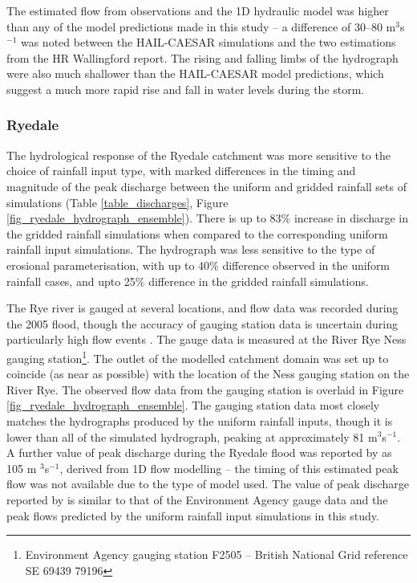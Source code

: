 The estimated flow from observations and the 1D hydraulic model was higher than any of the model predictions made in this study -- a difference of 30--80 m\(^3\)s\(^{-1}\) was noted between the HAIL-CAESAR simulations and the two estimations from the HR Wallingford report. The rising and falling limbs of the hydrograph were also much shallower than the HAIL-CAESAR model predictions, which suggest a much more rapid rise and fall in water levels during the storm. 

\subsubsection{Ryedale}

The hydrological response of the Ryedale catchment was more sensitive to the choice of rainfall input type, with marked differences in the timing and magnitude of the peak discharge between the uniform and gridded rainfall sets of simulations (Table \ref{table_discharges}, Figure \ref{fig_ryedale_hydrograph_ensemble}). There is up to 83\% increase in discharge in the gridded rainfall simulations when compared to the corresponding uniform rainfall input simulations. The hydrograph was less sensitive to the type of erosional parameterisation, with up to 40\% difference observed in the uniform rainfall cases, and upto 25\% difference in the gridded rainfall simulations. 

The Rye river is gauged at several locations, and flow data was recorded during the 2005 flood, though the accuracy of gauging station data is uncertain during particularly high flow events \citep{shaw2010hydrology}. The gauge data is measured at the River Rye Ness gauging station\footnote{Environment Agency gauging station F2505 -- British National Grid reference SE 69439 79196}. The outlet of the modelled catchment domain was set up to coincide (as near as possible) with the location of the Ness gauging station on the River Rye. The observed flow data from the gauging station is overlaid in Figure \ref{fig_ryedale_hydrograph_ensemble}. The gauging station data most closely matches the hydrographs produced by the uniform rainfall inputs, though it is lower than all of the simulated hydrograph, peaking at approximately 81 m\(^3\)s\(^{-1}\). A further value of peak discharge during the Ryedale flood was reported by \citet{wass2008investigation} as 105 m \(^3\)s\(^{-1}\), derived from 1D flow modelling -- the timing of this estimated peak flow was not available due to the type of model used. The value of peak discharge reported by \citet{wass2008investigation} is similar to that of the Environment Agency gauge data and the peak flows predicted by the uniform rainfall input simulations in this study. 

